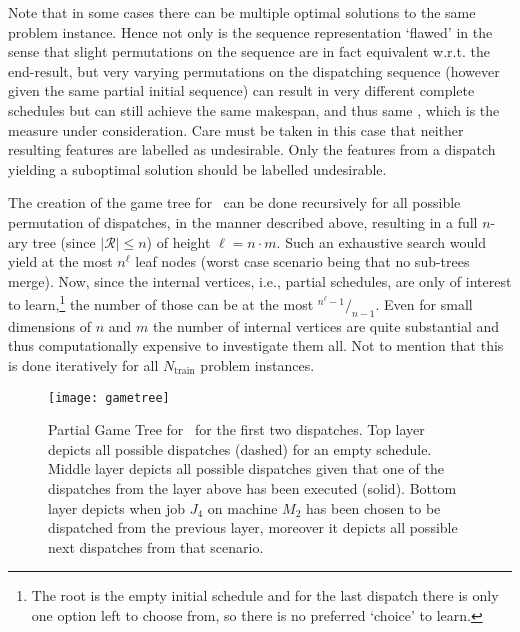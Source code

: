 Note that in some cases there can be multiple optimal solutions to the same problem instance. Hence not only is the sequence representation `flawed' in the sense that slight permutations on the sequence are in fact equivalent w.r.t. the end-result, but very varying permutations on the dispatching sequence (however given the same partial initial sequence) can result in very different complete schedules but can still achieve the same makespan, and thus same \fullnamerho, which is the measure under consideration. Care must be taken in this case that neither resulting features are labelled as undesirable. Only the features from a dispatch yielding a suboptimal solution should be labelled undesirable. 

The creation of the game tree for \jsp\ can be done recursively for all possible permutation of dispatches, in the manner described above, resulting in a full \mbox{$n$-ary} tree (since $|\mathcal{R}|\leq n$) of height $\ell=n\cdot m$. Such an exhaustive search would yield at the most $n^{\ell}$ leaf nodes (worst case scenario being that no sub-trees merge). Now, since the internal vertices, i.e., partial schedules, are only of interest to learn,\footnote{The root is the empty initial schedule and for the last dispatch there is only one option left to choose from, so there is no preferred `choice' to learn.} the number of those can be at the most \mbox{${}^{n^{\ell}-1}/_{n-1}$}.
Even for small dimensions of $n$ and $m$ the number of internal vertices are quite substantial and thus computationally expensive to investigate them all. Not to mention that this is done iteratively for all $N_{\text{train}}$ problem instances.

\begin{figure}
\texttt{[image: gametree]}
\caption[Partial Game Tree for \jsp]{Partial Game Tree for \jsp\ for the first two dispatches. 
Top layer depicts all possible dispatches (dashed) for an empty schedule. 
Middle layer depicts all possible dispatches given that one of the dispatches from the layer above has been executed (solid). 
Bottom layer depicts when job $J_4$ on machine $M_2$ has been chosen to be dispatched from the previous layer, moreover it depicts all possible next dispatches from that scenario.}
\label{fig:jssp:gametree}
\end{figure}

